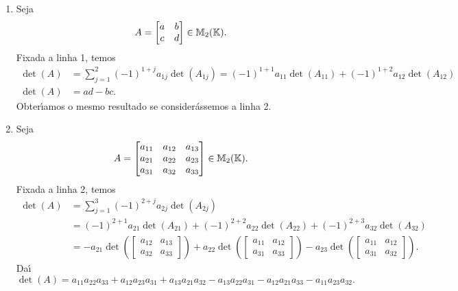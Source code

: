 \begin{exemplo}
	\begin{enumerate}[label={\arabic*})]
		\item Seja
		\[
			A =
			\begin{bmatrix}
				a & b\\
				c & d
			\end{bmatrix} \in \mathbb{M}_2(\mathbb{K}).
		\]
		Fixada a linha 1, temos
		\begin{align*}
			\det(A) &= \sum_{j = 1}^2(-1)^{1 + j}a_{1j}\det(A_{1j}) = (-1)^{1 + 1}a_{11}\det(A_{11}) + (-1)^{1 + 2}a_{12}\det(A_{12})\\
			\det(A) &= ad - bc.
	    \end{align*}
		Obter{\'\i}amos o mesmo resultado se consider\'assemos a linha 2.

		\item Seja
		\[
			A =
			\begin{bmatrix}
				a_{11} & a_{12} & a_{13}\\
				a_{21} & a_{22} & a_{23}\\
				a_{31} & a_{32} & a_{33}
			\end{bmatrix} \in \mathbb{M}_2(\mathbb{K}).
		\]
		Fixada a linha 2, temos
		\begin{align*}
			\det(A) &= \sum_{j = 1}^3(-1)^{2 + j}a_{2j}\det(A_{2j}) \\ &= (-1)^{2 + 1}a_{21}\det(A_{21}) + (-1)^{2 + 2}a_{22}\det(A_{22}) + (-1)^{2 + 3}a_{32}\det(A_{32})\\ &= -a_{21}\det\left(\begin{bmatrix}a_{12} & a_{13}\\a_{32} & a_{33}\end{bmatrix}\right) + a_{22}\det\left(\begin{bmatrix}a_{11} & a_{12}\\a_{31} & a_{33}\end{bmatrix}\right) - a_{23}\det\left(\begin{bmatrix}a_{11} & a_{12}\\a_{31} & a_{32}\end{bmatrix}\right).
		\end{align*}
		Da{\'\i}
		\[
			\det(A) = a_{11}a_{22}a_{33} + a_{12}a_{23}a_{31} + a_{13}a_{21}a_{32} - a_{13}a_{22}a_{31} - a_{12}a_{21}a_{33} - a_{11}a_{23}a_{32}.
		\]


\end{enumerate}
\end{exemplo}
